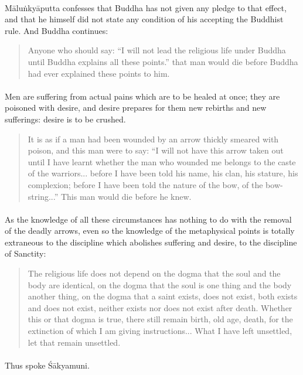 \documentclass[a4paper, 11pt, oneside, english, landscape]{article}
\begin{document}
\paragraph{}
Māluṅkyāputta confesses that Buddha has not given any pledge to that effect, and that he himself did not state any condition of his accepting the Buddhist rule. And Buddha continues:
\begin{quotation}
\small
Anyone who should say: ``I will not lead the religious life under Buddha until Buddha explains all these points.'' that man would die before Buddha had ever explained these points to him.
\end{quotation}
\paragraph{}
Men are suffering from actual pains which are to be healed at once; they are poisoned with desire, and desire prepares for them new rebirths and new sufferings: desire is to be crushed.
\begin{quotation}
\small
It is as if a man had been wounded by an arrow thickly smeared with poison, and this man were to say: ``I will not have this arrow taken out until I have learnt whether the man who wounded me belongs to the caste of the warriors... before I have been told his name, his clan, his stature, his complexion; before I have been told the nature of the bow, of the bow-string...'' This man would die before he knew.
\end{quotation}
\paragraph{}
As the knowledge of all these circumstances has nothing to do with the removal of the deadly arrows, even so the knowledge of the metaphysical points is totally extraneous to the discipline which abolishes suffering and desire, to the discipline of Sanctity:
\begin{quotation}
\small
The religious life does not depend on the dogma that the soul and the body are identical, on the dogma that the soul is one thing and the body another thing, on the dogma that a saint exists, does not exist, both exists and does not exist, neither exists nor does not exist after death. Whether this or that dogma is true, there still remain birth, old age, death, for the extinction of which I am giving instructions... What I have left unsettled, let that remain unsettled.
\end{quotation}
\paragraph{}
Thus spoke Śākyamuni.
\end{document}
